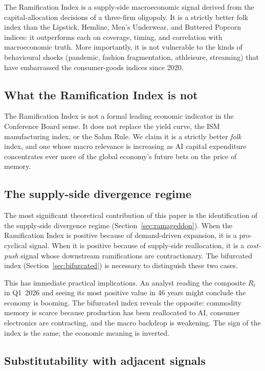 \documentclass[12pt]{article}
\theoremstyle{definition}
\begin{document}
The Ramification Index is a supply-side macroeconomic signal derived from the capital-allocation decisions of a three-firm oligopoly. It is a strictly better folk index than the Lipstick, Hemline, Men's Underwear, and Buttered Popcorn indices: it outperforms each on coverage, timing, and correlation with macroeconomic truth. More importantly, it is not vulnerable to the kinds of behavioural shocks (pandemic, fashion fragmentation, athleisure, streaming) that have embarrassed the consumer-goods indices since 2020.

\subsection{What the Ramification Index is not}

The Ramification Index is not a formal leading economic indicator in the Conference Board sense. It does not replace the yield curve, the ISM manufacturing index, or the Sahm Rule. We claim it is a strictly better \emph{folk} index, and one whose macro relevance is increasing as AI capital expenditure concentrates ever more of the global economy's future bets on the price of memory.

\subsection{The supply-side divergence regime}

The most significant theoretical contribution of this paper is the identification of the supply-side divergence regime (Section~\ref{sec:ramageddon}). When the Ramification Index is positive because of demand-driven expansion, it is a pro-cyclical signal. When it is positive because of supply-side reallocation, it is a \emph{cost-push} signal whose downstream ramifications are contractionary. The bifurcated index (Section~\ref{sec:bifurcated}) is necessary to distinguish these two cases.

This has immediate practical implications. An analyst reading the composite $R_t$ in Q1~2026 and seeing its most positive value in 46 years might conclude the economy is booming. The bifurcated index reveals the opposite: commodity memory is scarce because production has been reallocated to AI, consumer electronics are contracting, and the macro backdrop is weakening. The sign of the index is the same; the economic meaning is inverted.

\subsection{Substitutability with adjacent signals}
\end{document}
